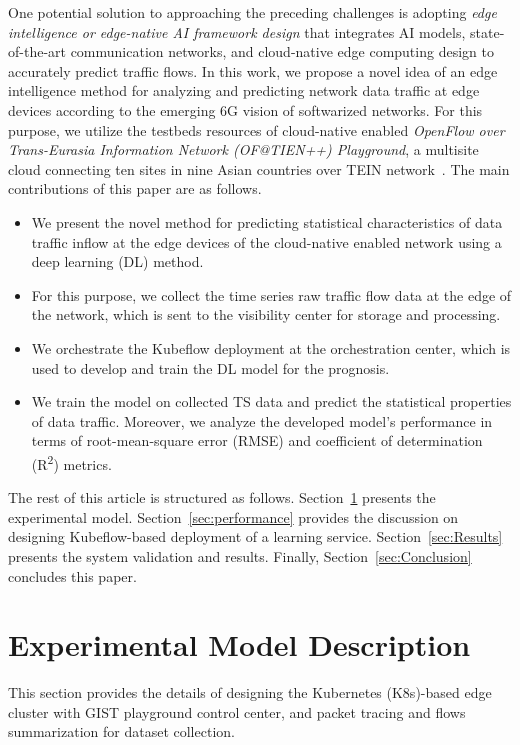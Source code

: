 \documentclass[10pt, conference]{IEEEtran}
\begin{document}
One potential solution to approaching the preceding challenges is adopting \textit{edge intelligence or edge-native AI framework design} that integrates AI models, state-of-the-art communication networks, and cloud-native edge computing design to accurately predict traffic flows.
In this work, we propose a novel idea of an edge intelligence method for analyzing and predicting network data traffic at edge devices according to the emerging 6G vision of softwarized networks. For this purpose, we utilize the testbeds resources of cloud-native enabled \textit{OpenFlow over Trans-Eurasia Information Network (OF@TIEN++) Playground}, a multisite cloud connecting ten sites in nine Asian countries over TEIN network~\cite{rathore2020maintaining}. 
The main contributions of this paper are as follows.
\begin{itemize}
\item We present the novel method for predicting statistical characteristics of data traffic inflow at the edge devices of the cloud-native enabled network using a deep learning (DL) method.
\item For this purpose, we collect the time series raw traffic flow data at the edge of the network, which is sent to the visibility center for storage and processing.
\item We orchestrate the Kubeflow deployment at the orchestration center, which is used to develop and train the DL model for the prognosis.
\item We train the model on collected TS data and predict the statistical properties of data traffic. Moreover, we analyze the developed model's performance in terms of root-mean-square error (RMSE) and coefficient of determination (R\textsuperscript{2}) metrics.
\end{itemize}
The rest of this article is structured as follows. Section~\ref{sec:sysModel} presents the experimental model. Section~\ref{sec:performance} provides the discussion on designing Kubeflow-based deployment of a learning service. Section~\ref{sec:Results} presents the system validation and results. Finally, Section~\ref{sec:Conclusion} concludes this paper.
\section{Experimental Model Description}
\label{sec:sysModel}
This section provides the details of designing the Kubernetes (K8s)-based edge cluster with GIST playground control center, and packet tracing and flows summarization for dataset collection.
\end{document}
